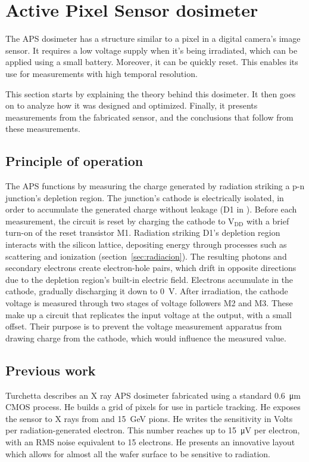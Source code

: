 \section{Active Pixel Sensor dosimeter}
The APS dosimeter has a structure similar to a pixel in a digital camera's image sensor.
It requires a low voltage supply when it's being irradiated,
which can be applied using a small battery.
Moreover, it can be quickly reset.
This enables its use for measurements with high temporal resolution.

This section starts by explaining the theory behind this dosimeter.
It then goes on to analyze how it was designed and optimized.
Finally, it presents measurements from the fabricated sensor,
and the conclusions that follow from these measurements.
%
\subsection{Principle of operation}
%
The APS functions by measuring the charge generated by radiation
striking a p-n junction's depletion region.
The junction's cathode is electrically isolated,
in order to accumulate the generated charge without leakage
(D1 in ).
Before each measurement,
the circuit is reset by charging the cathode to
V$_{\text{DD}}$ with a brief turn-on of the reset transistor M1.
Radiation striking D1's depletion region interacts with the silicon lattice,
depositing energy through processes such as scattering and ionization (section~\ref{sec:radiacion}).
The resulting photons and secondary electrons create electron-hole pairs,
which drift in opposite directions due to the depletion region's built-in electric field.
Electrons accumulate in the cathode, gradually discharging it down to
\SI{0}{\volt}.
After irradiation,
the cathode voltage is measured through two stages of voltage followers M2 and M3.
These make up a circuit that replicates the input voltage at the output,
with a small offset.
Their purpose is to prevent the voltage measurement apparatus from
drawing charge from the cathode,
which would influence the measured value.
\subsection{Previous work}
Turchetta\cite{turchetta_monolithic_2001} describes an X ray APS dosimeter
fabricated using a standard \SI{0.6}{\micro\meter} CMOS process.
He builds a grid of pixels for use in particle tracking.
He exposes the sensor to X rays from 
and \SI{15}{\giga\electronvolt} pions.
He writes the sensitivity in Volts per radiation-generated electron.
This number reaches up to \SI{15}{\micro\volt} per electron,
with an RMS noise equivalent to 15 electrons.
He presents an innovative layout which allows for almost all the wafer surface
to be sensitive to radiation.

